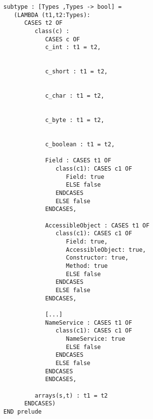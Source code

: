\begin{verbatim}
subtype : [Types ,Types -> bool] =
   (LAMBDA (t1,t2:Types):
      CASES t2 OF
         class(c) :
            CASES c OF
            c_int : t1 = t2,


            c_short : t1 = t2,


            c_char : t1 = t2,


            c_byte : t1 = t2,


            c_boolean : t1 = t2,

            Field : CASES t1 OF
               class(c1): CASES c1 OF
                  Field: true
                  ELSE false
               ENDCASES
               ELSE false
            ENDCASES,

            AccessibleObject : CASES t1 OF
               class(c1): CASES c1 OF
                  Field: true,
                  AccessibleObject: true,
                  Constructor: true,
                  Method: true
                  ELSE false
               ENDCASES
               ELSE false
            ENDCASES,

            [...]
            NameService : CASES t1 OF
               class(c1): CASES c1 OF
                  NameService: true
                  ELSE false
               ENDCASES
               ELSE false
            ENDCASES
            ENDCASES,

         arrays(s,t) : t1 = t2
      ENDCASES)
END prelude
\end{verbatim}
